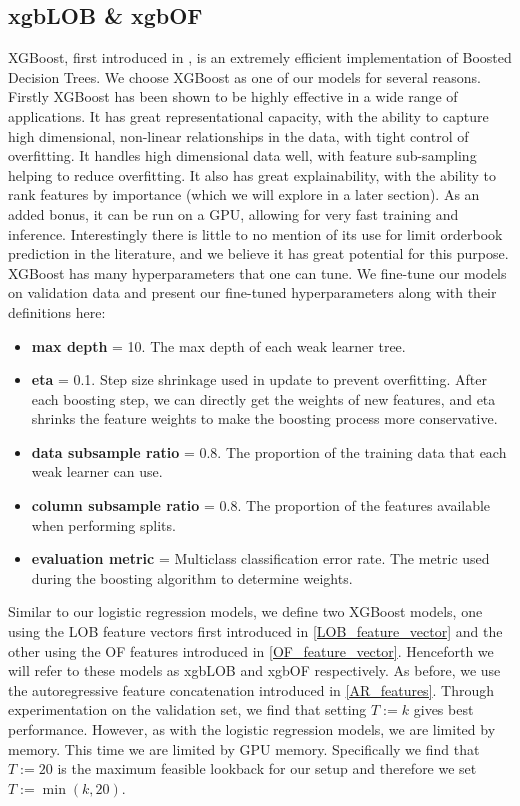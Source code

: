 \subsection{xgbLOB \& xgbOF}
XGBoost, first introduced in \cite{XGBOOST2016}, is an extremely efficient implementation of Boosted Decision Trees.
We choose XGBoost as one of our models for several reasons.
Firstly XGBoost has been shown to be highly effective in a wide range of applications.
It has great representational capacity, with the ability to capture high dimensional, non-linear relationships
in the data, with tight control of overfitting.
It handles high dimensional data well, with feature sub-sampling helping to reduce overfitting.
It also has great explainability, with the ability to rank features by importance (which we will explore in a later section).
As an added bonus, it can be run on a GPU, allowing for very fast training and inference.
Interestingly there is little to no mention of its use for limit orderbook prediction in the literature,
and we believe it has great potential for this purpose.
XGBoost has many hyperparameters that one can tune. We fine-tune our models on validation data and 
present our fine-tuned hyperparameters along with their definitions here:
 \begin{itemize}
    \item \textbf{max depth} = 10. The max depth of each weak learner tree.
    \item \textbf{eta} = 0.1. Step size shrinkage used in update to prevent overfitting. After each boosting step, we can directly get the weights of new features, and eta shrinks the feature weights to make the boosting process more conservative.
    \item \textbf{data subsample ratio} = 0.8. The proportion of the training data that each weak learner can use.
    \item \textbf{column subsample ratio} = 0.8. The proportion of the features available when performing splits.
    \item \textbf{evaluation metric} = Multiclass classification error rate. The metric used during the boosting algorithm to determine weights.
\end{itemize}


Similar to our logistic regression models, we define two XGBoost models, one using the LOB feature vectors first introduced in \ref{LOB_feature_vector}
and the other using the OF features introduced in \ref{OF_feature_vector}. 
Henceforth we will refer to these models as xgbLOB and xgbOF respectively.
As before, we use the autoregressive feature concatenation introduced in \ref{AR_features}.
Through experimentation on the validation set, we find that setting $T := k$ gives best performance.
However, as with the logistic regression models, we are limited by memory. 
This time we are limited by GPU memory. Specifically we find that $T := 20$ is the maximum
feasible lookback for our setup and therefore we set  $T := \min(k, 20)$.
\clearpage

